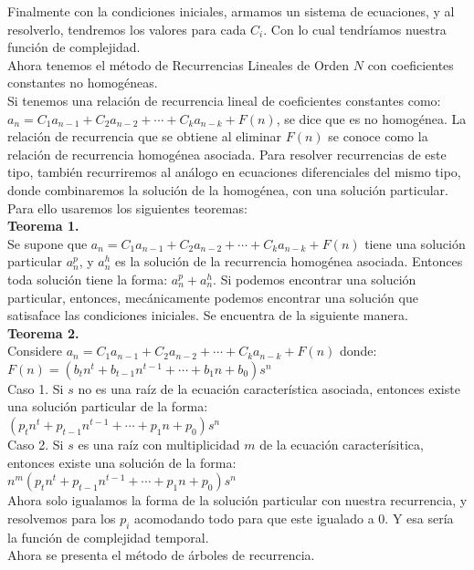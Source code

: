 \documentclass[12pt,twoside]{article}
\begin{document}
Finalmente con la condiciones iniciales, armamos un sistema de ecuaciones, y al resolverlo, tendremos los valores para cada $C_i$. Con lo cual tendríamos nuestra función de complejidad.
\newline
\\ Ahora tenemos el método de Recurrencias Lineales de Orden $N$ con coeficientes constantes no homogéneas.
\\ Si tenemos una relación de recurrencia lineal de coeficientes constantes como: $a_n=C_1a_{n-1}+C_2a_{n-2}+\dotsm+C_ka_{n-k}+F(n)$, se dice que es no homogénea. La relación de recurrencia que se obtiene al eliminar $F(n)$ se conoce como la relación de recurrencia homogénea asociada. Para resolver recurrencias de este tipo, también recurriremos al análogo en ecuaciones diferenciales del mismo tipo, donde combinaremos la solución de la homogénea, con una solución particular. Para ello usaremos los siguientes teoremas:
\\ \textbf{Teorema 1.}
\\ Se supone que $a_n=C_1a_{n-1}+C_2a_{n-2}+\dotsm+C_ka_{n-k}+F(n)$ tiene una solución particular $a_n^p$, y $a_n^h$ es la solución de la recurrencia homogénea asociada. Entonces toda solución tiene la forma: $a_n^p+a_n^h$. Si podemos encontrar una solución particular, entonces, mecánicamente podemos encontrar una solución que satisaface las condiciones iniciales. Se encuentra de la siguiente manera.
\\ \textbf{Teorema 2.}
\\ Considere $a_n=C_1a_{n-1}+C_2a_{n-2}+\dotsm+C_ka_{n-k}+F(n)$ donde: 
\\ $F(n)=(b_tn^t+b_{t-1}n^{t-1}+\dotsb+b_1n+b_0)s^n$
\\ Caso 1. Si $s$ no es una raíz de la ecuación característica asociada, entonces existe una solución particular de la forma:
\\ $(p_tn^t+p_{t-1}n^{t-1}+\dotsb+p_1n+p_0)s^n$
\\ Caso 2. Si $s$ es una raíz con multiplicidad $m$ de la ecuación caracterísitica, entonces existe una solución de la forma:
\\ $n^m(p_tn^t+p_{t-1}n^{t-1}+\dotsb+p_1n+p_0)s^n$
\\ Ahora solo igualamos la forma de la solución particular con nuestra recurrencia, y resolvemos para los $p_i$ acomodando todo para que este igualado a 0. Y esa sería la función de complejidad temporal.
\newline
\\ Ahora se presenta el método de árboles de recurrencia.
\end{document}
